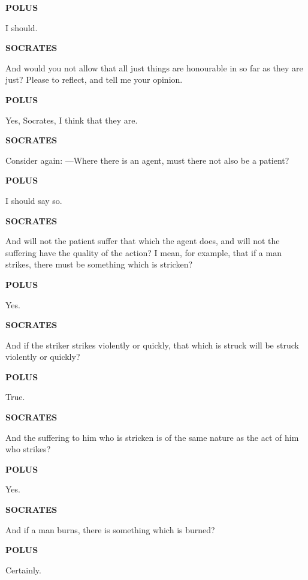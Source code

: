 \documentclass[11pt,letter]{article}
\begin{document}
\par \textbf{POLUS}
\par   I should.

\par \textbf{SOCRATES}
\par   And would you not allow that all just things are honourable in so far as they are just? Please to reflect, and tell me your opinion.

\par \textbf{POLUS}
\par   Yes, Socrates, I think that they are.

\par \textbf{SOCRATES}
\par   Consider again: —Where there is an agent, must there not also be a patient?

\par \textbf{POLUS}
\par   I should say so.

\par \textbf{SOCRATES}
\par   And will not the patient suffer that which the agent does, and will not the suffering have the quality of the action? I mean, for example, that if a man strikes, there must be something which is stricken?

\par \textbf{POLUS}
\par   Yes.

\par \textbf{SOCRATES}
\par   And if the striker strikes violently or quickly, that which is struck will be struck violently or quickly?

\par \textbf{POLUS}
\par   True.

\par \textbf{SOCRATES}
\par   And the suffering to him who is stricken is of the same nature as the act of him who strikes?

\par \textbf{POLUS}
\par   Yes.

\par \textbf{SOCRATES}
\par   And if a man burns, there is something which is burned?

\par \textbf{POLUS}
\par   Certainly.
\end{document}
